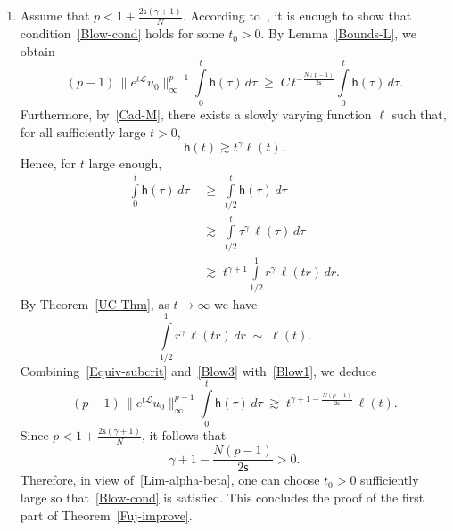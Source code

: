 \documentclass[12pt,reqno]{amsart}
\theoremstyle{plain}
\theoremstyle{definition}
\theoremstyle{remark}
\numberwithin{equation}{section}
\newcommand{\sL}{\mathscr{L}}
\newcommand{\h}{\mathsf h}
\newcommand{\ts}{\mathsf{s}}
\begin{document}
\medskip

\begin{enumerate}[label=(\roman*)]
    \item Assume that $p < 1 + \frac{2\ts(\gamma + 1)}{N}$. According to~\cite[Theorem~6]{Migu-2025}, it is enough to show that condition~\eqref{Blow-cond} holds for some $t_0>0$.  
    By Lemma~\ref{Bounds-L}, we obtain
    \begin{equation}
        \label{Blow1}
        (p-1)\, \|e^{t\sL} u_0\|_\infty^{p-1} \int\limits_0^{t} \h(\tau)\, d\tau 
        \;\geq\; C\, t^{-\frac{N(p-1)}{2\ts}} \int\limits_0^t \h(\tau)\, d\tau.
    \end{equation}
    Furthermore, by~\eqref{Cad-M}, there exists a slowly varying function $\ell$ such that, for all sufficiently large $t>0$,
    \begin{equation}
        \label{Blow2}
        \h(t) \gtrsim t^{\gamma}\ell(t).
    \end{equation}
    Hence, for $t$ large enough,
    \begin{equation}
        \label{Blow3}
        \begin{split}
        \int\limits_0^t \h(\tau)\, d\tau 
        \;&\geq\; \int\limits_{t/2}^t \h(\tau)\, d\tau \\
        \;&\gtrsim\;\int\limits_{t/2}^t \tau^{\gamma}\,\ell(\tau)\, d\tau\\
        \;&\gtrsim\;t^{\gamma+1}\int\limits_{1/2}^1 r^{\gamma}\,\ell(t r)\, dr.
        \end{split}
    \end{equation}
    By Theorem~\ref{UC-Thm}, as $t\to\infty$ we have
    \begin{equation}
        \label{Equiv-subcrit}
        \int\limits_{1/2}^1 r^{\gamma}\,\ell(t r)\, dr\;\sim\; \ell(t).
    \end{equation}
    Combining~\eqref{Equiv-subcrit} and~\eqref{Blow3} with~\eqref{Blow1}, we deduce
    \begin{equation}
        \label{Blow4}
        (p-1)\, \|e^{t\sL} u_0\|_\infty^{p-1} \int\limits_0^{t} \h(\tau)\, d\tau 
        \;\gtrsim\; t^{\gamma+1 - \frac{N(p-1)}{2\ts}}\,\ell(t).
    \end{equation}
    Since $p < 1 + \frac{2\ts(\gamma+1)}{N}$, it follows that
    \[
        \gamma+1 - \frac{N(p-1)}{2\ts} > 0.
    \]
    Therefore, in view of~\eqref{Lim-alpha-beta}, one can choose $t_0>0$ sufficiently large so that~\eqref{Blow-cond} is satisfied.  
    This concludes the proof of the first part of Theorem~\ref{Fuj-improve}.


\end{enumerate}
\end{document}
